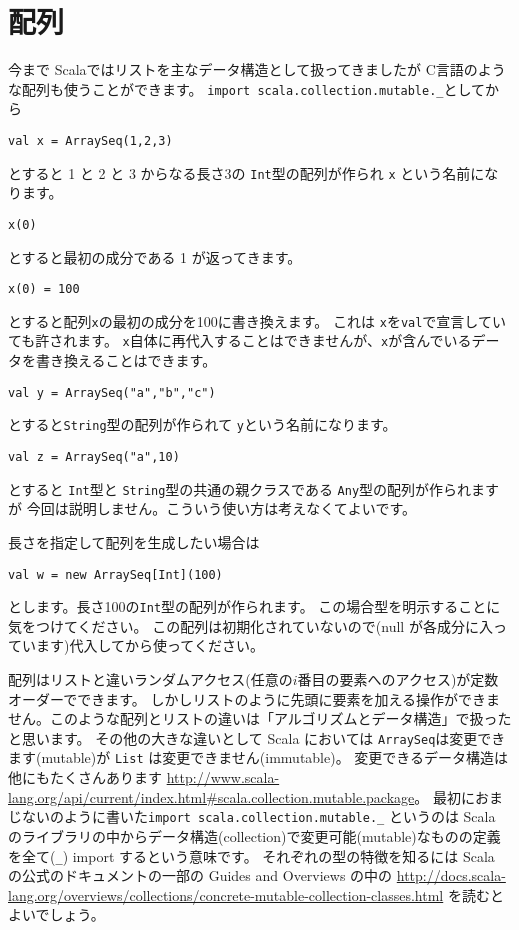 \documentclass[a4paper,twoside,onecolumn,openany,article]{memoir}
\theoremstyle{remark}
\begin{document}
\section{配列}
今まで Scalaではリストを主なデータ構造として扱ってきましたが
C言語のような配列も使うことができます。
\texttt{import scala.collection.mutable.\_}としてから
\begin{verbatim}
val x = ArraySeq(1,2,3)
\end{verbatim}
とすると 1 と 2 と 3 からなる長さ3の \texttt{Int}型の配列が作られ \texttt{x} という名前になります。
\begin{verbatim}
x(0)
\end{verbatim}
とすると最初の成分である 1 が返ってきます。
\begin{verbatim}
x(0) = 100
\end{verbatim}
とすると配列\texttt{x}の最初の成分を100に書き換えます。
これは \texttt{x}を\texttt{val}で宣言していても許されます。
\texttt{x}自体に再代入することはできませんが、\texttt{x}が含んでいるデータを書き換えることはできます。
\begin{verbatim}
val y = ArraySeq("a","b","c")
\end{verbatim}
とすると\texttt{String}型の配列が作られて \texttt{y}という名前になります。
\begin{verbatim}
val z = ArraySeq("a",10)
\end{verbatim}
とすると \texttt{Int}型と \texttt{String}型の共通の親クラスである \texttt{Any}型の配列が作られますが
今回は説明しません。こういう使い方は考えなくてよいです。

長さを指定して配列を生成したい場合は
\begin{verbatim}
val w = new ArraySeq[Int](100)
\end{verbatim}
とします。長さ100の\texttt{Int}型の配列が作られます。
この場合型を明示することに気をつけてください。
この配列は初期化されていないので(null が各成分に入っています)代入してから使ってください。

配列はリストと違いランダムアクセス(任意の$i$番目の要素へのアクセス)が定数オーダーでできます。
しかしリストのように先頭に要素を加える操作ができません。このような配列とリストの違いは「アルゴリズムとデータ構造」で扱ったと思います。
その他の大きな違いとして Scala においては \texttt{ArraySeq}は変更できます(mutable)が \texttt{List} は変更できません(immutable)。
変更できるデータ構造は他にもたくさんあります
\url{http://www.scala-lang.org/api/current/index.html#scala.collection.mutable.package}。
最初におまじないのように書いた\texttt{import scala.collection.mutable.\_}
というのは Scala のライブラリの中からデータ構造(collection)で変更可能(mutable)なものの定義を全て(\texttt{\_}) import するという意味です。
それぞれの型の特徴を知るには Scala の公式のドキュメントの一部の Guides and Overviews の中の
\url{http://docs.scala-lang.org/overviews/collections/concrete-mutable-collection-classes.html}
を読むとよいでしょう。
\end{document}
